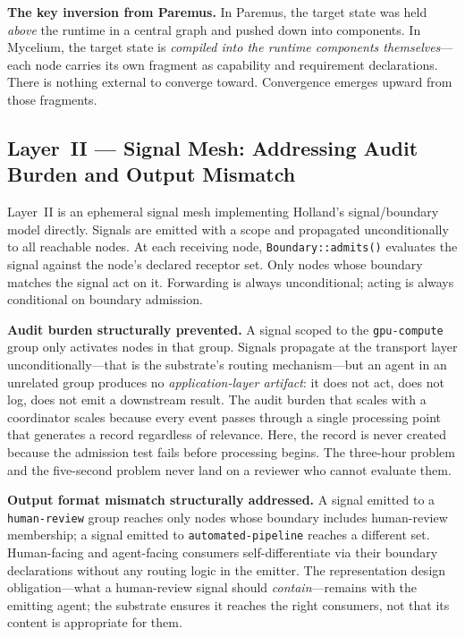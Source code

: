 \documentclass[11pt]{article}
\begin{document}
\textbf{The key inversion from Paremus.} In Paremus, the target state was held
\emph{above} the runtime in a central graph and pushed down into components. In
Mycelium, the target state is \emph{compiled into the runtime components
themselves}---each node carries its own fragment as capability and requirement
declarations. There is nothing external to converge toward. Convergence emerges
upward from those fragments.

\subsection{Layer~II --- Signal Mesh: Addressing Audit Burden and Output Mismatch}

Layer~II is an ephemeral signal mesh implementing Holland's signal/boundary model
directly. Signals are emitted with a scope and propagated unconditionally to all
reachable nodes. At each receiving node, \texttt{Boundary::admits()} evaluates the
signal against the node's declared receptor set. Only nodes whose boundary matches
the signal act on it. Forwarding is always unconditional; acting is always
conditional on boundary admission.

\textbf{Audit burden structurally prevented.} A signal scoped to the
\texttt{gpu-compute} group only activates nodes in that group. Signals propagate
at the transport layer unconditionally---that is the substrate's routing
mechanism---but an agent in an unrelated group produces no \emph{application-layer
artifact}: it does not act, does not log, does not emit a downstream result. The
audit burden that scales with a coordinator scales because every event passes
through a single processing point that generates a record regardless of
relevance. Here, the record is never created because the admission test fails
before processing begins. The three-hour problem and the five-second problem
never land on a reviewer who cannot evaluate them.

\textbf{Output format mismatch structurally addressed.} A signal emitted to a
\texttt{human-review} group reaches only nodes whose boundary includes
human-review membership; a signal emitted to \texttt{automated-pipeline} reaches a
different set. Human-facing and agent-facing consumers self-differentiate via their
boundary declarations without any routing logic in the emitter. The
representation design obligation---what a human-review signal should
\emph{contain}---remains with the emitting agent; the substrate ensures it
reaches the right consumers, not that its content is appropriate for them.
\end{document}

